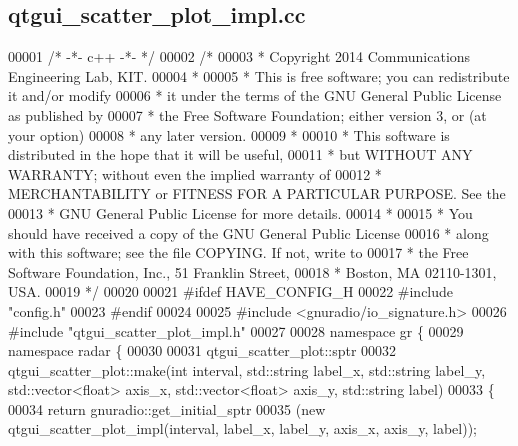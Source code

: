 \subsection{qtgui\+\_\+scatter\+\_\+plot\+\_\+impl.\+cc}
\label{qtgui__scatter__plot__impl_8cc_source}

\begin{DoxyCode}
00001 \textcolor{comment}{/* -*- c++ -*- */}
00002 \textcolor{comment}{/* }
00003 \textcolor{comment}{ * Copyright 2014 Communications Engineering Lab, KIT.}
00004 \textcolor{comment}{ * }
00005 \textcolor{comment}{ * This is free software; you can redistribute it and/or modify}
00006 \textcolor{comment}{ * it under the terms of the GNU General Public License as published by}
00007 \textcolor{comment}{ * the Free Software Foundation; either version 3, or (at your option)}
00008 \textcolor{comment}{ * any later version.}
00009 \textcolor{comment}{ * }
00010 \textcolor{comment}{ * This software is distributed in the hope that it will be useful,}
00011 \textcolor{comment}{ * but WITHOUT ANY WARRANTY; without even the implied warranty of}
00012 \textcolor{comment}{ * MERCHANTABILITY or FITNESS FOR A PARTICULAR PURPOSE.  See the}
00013 \textcolor{comment}{ * GNU General Public License for more details.}
00014 \textcolor{comment}{ * }
00015 \textcolor{comment}{ * You should have received a copy of the GNU General Public License}
00016 \textcolor{comment}{ * along with this software; see the file COPYING.  If not, write to}
00017 \textcolor{comment}{ * the Free Software Foundation, Inc., 51 Franklin Street,}
00018 \textcolor{comment}{ * Boston, MA 02110-1301, USA.}
00019 \textcolor{comment}{ */}
00020 
00021 \textcolor{preprocessor}{#ifdef HAVE\_CONFIG\_H}
00022 \textcolor{preprocessor}{#include "config.h"}
00023 \textcolor{preprocessor}{#endif}
00024 
00025 \textcolor{preprocessor}{#include <gnuradio/io\_signature.h>}
00026 \textcolor{preprocessor}{#include "qtgui_scatter_plot_impl.h"}
00027 
00028 \textcolor{keyword}{namespace }gr \{
00029   \textcolor{keyword}{namespace }radar \{
00030 
00031     qtgui_scatter_plot::sptr
00032     qtgui_scatter_plot::make(\textcolor{keywordtype}{int} interval, std::string label\_x, std::string label\_y, std::vector<float> 
      axis\_x, std::vector<float> axis\_y, std::string label)
00033     \{
00034       \textcolor{keywordflow}{return} gnuradio::get\_initial\_sptr
00035         (\textcolor{keyword}{new} qtgui_scatter_plot_impl(interval, label\_x, label\_y, axis\_x, axis\_y, label));

\end{DoxyCode}
